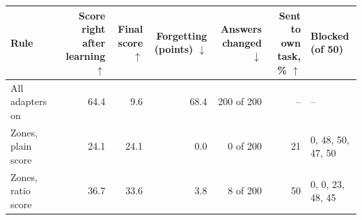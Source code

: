 \begin{tabular}{lrrrrrl}
    \toprule
    Rule & \shortstack[r]{Score\\right after\\learning $\uparrow$} & Final score $\uparrow$ & \shortstack[r]{Forgetting\\(points) $\downarrow$} & \shortstack[r]{Answers\\changed $\downarrow$} & \shortstack[r]{Sent to own\\task, \% $\uparrow$} & Blocked (of 50) \\
    \midrule
    All adapters on & 64.4 & 9.6 & 68.4 & 200 of 200 & -- & -- \\
    Zones, plain score & 24.1 & 24.1 & 0.0 & 0 of 200 & 21 & 0, 48, 50, 47, 50 \\
    Zones, ratio score & 36.7 & 33.6 & 3.8 & 8 of 200 & 50 & 0, 0, 23, 48, 45 \\
    \bottomrule
\end{tabular}
